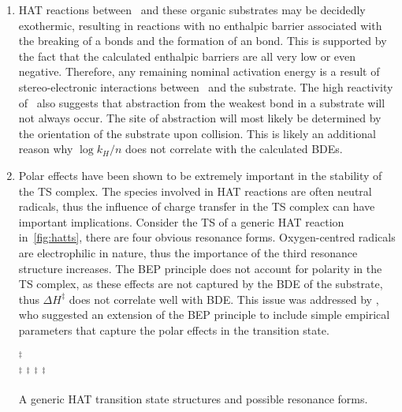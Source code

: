 \begin{enumerate}
  \item HAT reactions between \cumo\ and these organic substrates may be
  decidedly exothermic, resulting in reactions with no enthalpic barrier
  associated with the breaking of a  bonds and the formation of an
   bond. This is supported by the fact that the calculated enthalpic
  barriers are all very low or even negative. Therefore, any remaining nominal
  activation energy is a result of stereo-electronic interactions between \cumo\
  and the substrate. The high reactivity of \cumo\ also suggests that
  abstraction from the weakest bond in a substrate will not always occur.  The
  site of abstraction will most likely be determined by the orientation of the
  substrate upon collision. This is likely an additional reason why
  $\log{k_H/n}$ does not correlate with the calculated \ch{C-H} BDEs.

  \item Polar effects have been shown to be extremely important in the stability
  of the TS complex.\cite{Roberts1999} The species involved in HAT reactions are
  often neutral radicals, thus the influence of charge transfer in the TS
  complex can have important implications. Consider the TS of a generic HAT
  reaction in~\ref{fig:hatts}, there are four obvious resonance forms.
  Oxygen-centred radicals are electrophilic in nature, thus the importance of
  the third resonance structure increases. The BEP principle does not account
  for polarity in the TS complex, as these effects are not captured by the BDE
  of the substrate, thus $\Delta H^\ddagger$ does not correlate well with BDE.
  This issue was addressed by \citet{Roberts1994}, who suggested an extension of
  the BEP principle to include simple empirical parameters that capture the
  polar effects in the transition state.

  \begin{scheme}[!htbp]
    {\huge\ch{[O-H-C]}$^\ddagger$} \\
    \vspace{0.5cm}
    {\large
    \ch{[O^.H-C]}$^\ddagger$ \ch{<-> [O-H C^.]}$^\ddagger$ \ch{<->
      [O:^-H^.C^+]}$^\ddagger$ \ch{<-> [O^+H^.C:^-]}$^\ddagger$}
    \caption{A generic HAT transition state structures and possible resonance forms.}
  \label{fig:hatts}
  \end{scheme}


\end{enumerate}
